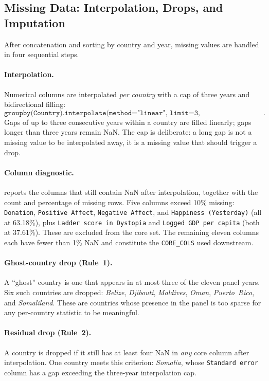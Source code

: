 \subsection{Missing Data: Interpolation, Drops, and Imputation}
\label{sec:data-cleaning-missing}

After concatenation and sorting by country and year, missing values are handled in four sequential steps.

\paragraph{Interpolation.} Numerical columns are interpolated \emph{per country} with a cap of three years and bidirectional filling:
\[
\texttt{groupby(Country).interpolate(method="linear",\ limit=3,\ limit\_direction="both")}.
\]
Gaps of up to three consecutive years within a country are filled linearly; gaps longer than three years remain NaN. The cap is deliberate: a long gap is not a missing value to be interpolated away, it is a missing value that should trigger a drop.

\paragraph{Column diagnostic.}  reports the columns that still contain NaN after interpolation, together with the count and percentage of missing rows. Five columns exceed 10\% missing: \texttt{Donation}, \texttt{Positive\ Affect}, \texttt{Negative\ Affect}, and \texttt{Happiness\ (Yesterday)} (all at 63.18\%), plus \texttt{Ladder\ score\ in\ Dystopia} and \texttt{Logged\ GDP\ per\ capita} (both at 37.61\%). These are excluded from the core set. The remaining eleven columns each have fewer than 1\% NaN and constitute the \texttt{CORE\_COLS} used downstream.



\paragraph{Ghost-country drop (Rule~1).} A ``ghost'' country is one that appears in at most three of the eleven panel years. Six such countries are dropped: \emph{Belize}, \emph{Djibouti}, \emph{Maldives}, \emph{Oman}, \emph{Puerto\ Rico}, and \emph{Somaliland}. These are countries whose presence in the panel is too sparse for any per-country statistic to be meaningful.

\paragraph{Residual drop (Rule~2).} A country is dropped if it still has at least four NaN in \emph{any} core column after interpolation. One country meets this criterion: \emph{Somalia}, whose \texttt{Standard\ error} column has a gap exceeding the three-year interpolation cap.

